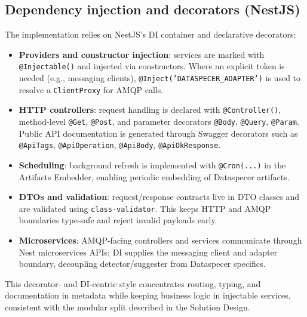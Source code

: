 \subsection{Dependency injection and decorators (NestJS)}
The implementation relies on NestJS’s DI container and declarative decorators:
\begin{itemize}
  \item \textbf{Providers and constructor injection}: services are marked with \texttt{@Injectable()} and injected via constructors. Where an explicit token is needed (e.g., messaging clients), \texttt{@Inject('DATASPECER\_ADAPTER')} is used to resolve a \texttt{ClientProxy} for AMQP calls.
  \item \textbf{HTTP controllers}: request handling is declared with \texttt{@Controller()}, method-level \texttt{@Get}, \texttt{@Post}, and parameter decorators \texttt{@Body}, \texttt{@Query}, \texttt{@Param}. Public API documentation is generated through Swagger decorators such as \texttt{@ApiTags}, \texttt{@ApiOperation}, \texttt{@ApiBody}, \texttt{@ApiOkResponse}.
  \item \textbf{Scheduling}: background refresh is implemented with \texttt{@Cron(...)} in the Artifacts Embedder, enabling periodic embedding of Dataspecer artifacts.
  \item \textbf{DTOs and validation}: request/response contracts live in DTO classes and are validated using \texttt{class-validator}. This keeps HTTP and AMQP boundaries type-safe and reject invalid payloads early.
  \item \textbf{Microservices}: AMQP-facing controllers and services communicate through Nest microservices APIs; DI supplies the messaging client and adapter boundary, decoupling detector/suggester from Dataspecer specifics.
\end{itemize}
This decorator- and DI-centric style concentrates routing, typing, and documentation in metadata while keeping business logic in injectable services, consistent with the modular split described in the Solution Design.

